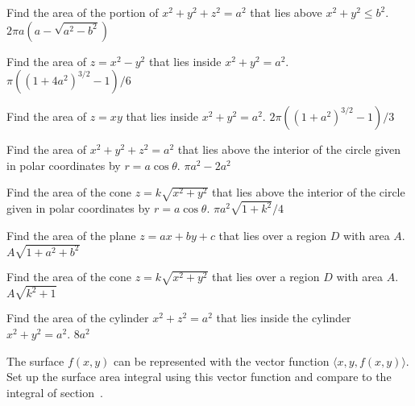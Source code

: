 \exercise Find the area of the portion of $x^2+y^2+z^2=a^2$ that lies
above $x^2+y^2\le b^2$.
\answer $2\pi a(a-\sqrt{a^2-b^2})$
\endanswer
\endexercise

\exercise Find the area of $z=x^2-y^2$ that lies inside $x^2+y^2=a^2$.
\answer $\pi((1+4a^2)^{3/2}-1)/6$
\endanswer
\endexercise

\exercise Find the area of $z=xy$ that lies inside $x^2+y^2=a^2$.
\answer $2\pi((1+a^2)^{3/2}-1)/3$
\endanswer
\endexercise

\exercise Find the area of $x^2+y^2+z^2=a^2$ 
that lies above the interior of the circle given in polar coordinates
by $r=a\cos \theta$.
\answer $\pi a^2-2a^2$
\endanswer
\endexercise

\exercise Find the area of the cone $z=k\sqrt{x^2+y^2}$
that lies above the interior of the circle given in polar coordinates
by $r=a\cos \theta$.
\answer $\pi a^2\sqrt{1+k^2}/4$
\endanswer
\endexercise

\exercise Find the area of the plane $z=ax+by+c$ that lies over a
region $D$ with area $A$.
\answer $A\sqrt{1+a^2+b^2}$
\endanswer
\endexercise

\exercise Find the area of the cone $z=k\sqrt{x^2+y^2}$ that lies over a
region $D$ with area $A$.
\answer $A\sqrt{k^2+1}$
\endanswer
\endexercise

\exercise Find the area of the cylinder $x^2+z^2=a^2$ that lies inside
the cylinder $x^2+y^2=a^2$.
\answer $8a^2$
\endanswer
\endexercise

\exercise The surface $f(x,y)$ can be represented with the vector
function $\langle x,y,f(x,y)\rangle$. Set up the surface area integral using
this vector function and compare to the integral of
section~. 
\endexercise

\endexercises

